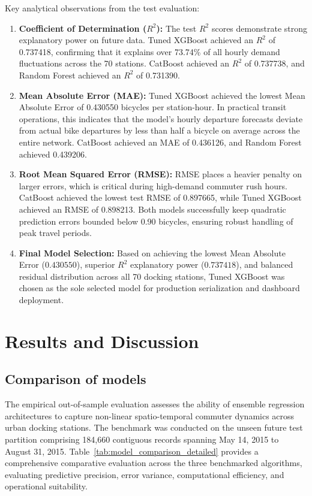 \documentclass[12pt, a4paper]{article}
\renewcommand{\_}{\textunderscore\allowbreak}
\begin{document}
Key analytical observations from the test evaluation:
\begin{enumerate}
    \item \textbf{Coefficient of Determination ($R^2$):} The test $R^2$ scores demonstrate strong explanatory power on future data. Tuned XGBoost achieved an $R^2$ of 0.737418, confirming that it explains over 73.74\% of all hourly demand fluctuations across the 70 stations. CatBoost achieved an $R^2$ of 0.737738, and Random Forest achieved an $R^2$ of 0.731390.
    \item \textbf{Mean Absolute Error (MAE):} Tuned XGBoost achieved the lowest Mean Absolute Error of 0.430550 bicycles per station-hour. In practical transit operations, this indicates that the model's hourly departure forecasts deviate from actual bike departures by less than half a bicycle on average across the entire network. CatBoost achieved an MAE of 0.436126, and Random Forest achieved 0.439206.
    \item \textbf{Root Mean Squared Error (RMSE):} RMSE places a heavier penalty on larger errors, which is critical during high-demand commuter rush hours. CatBoost achieved the lowest test RMSE of 0.897665, while Tuned XGBoost achieved an RMSE of 0.898213. Both models successfully keep quadratic prediction errors bounded below 0.90 bicycles, ensuring robust handling of peak travel periods.
    \item \textbf{Final Model Selection:} Based on achieving the lowest Mean Absolute Error ($0.430550$), superior $R^2$ explanatory power ($0.737418$), and balanced residual distribution across all 70 docking stations, Tuned XGBoost was chosen as the sole selected model for production serialization and dashboard deployment.
\end{enumerate}

\clearpage

\section{Results and Discussion}

\subsection{Comparison of models}
The empirical out-of-sample evaluation assesses the ability of ensemble regression architectures to capture non-linear spatio-temporal commuter dynamics across urban docking stations. The benchmark was conducted on the unseen future test partition comprising 184,660 contiguous records spanning May 14, 2015 to August 31, 2015. Table~\ref{tab:model_comparison_detailed} provides a comprehensive comparative evaluation across the three benchmarked algorithms, evaluating predictive precision, error variance, computational efficiency, and operational suitability.
\end{document}
